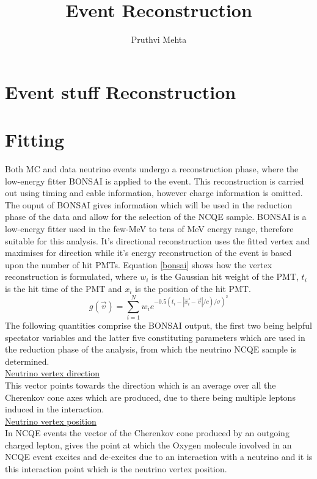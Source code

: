 \documentclass{article}
\title{Event Reconstruction}
\author{Pruthvi Mehta}
\begin{document}
\maketitle

\section{Event stuff Reconstruction}
\section{Fitting}
Both MC and data neutrino events undergo a reconstruction phase, where the low-energy fitter BONSAI is applied to the event. This reconstruction is carried out using timing and cable information, however charge information is omitted. The ouput of BONSAI gives information which will be used in the reduction phase of the data and allow for the selection of the NCQE sample. BONSAI is a low-energy fitter used in the few-MeV to tens of MeV energy range, therefore suitable for this analysis. It's directional reconstruction uses the fitted vertex and maximises for direction while it's energy reconstruction of the event is based upon the number of hit PMTs. Equation \ref{bonsai} shows how the vertex reconstruction is formulated, where $w_{i}$ is the Gaussian hit weight of the PMT, $t_{i}$ is the hit time of the PMT and $x_{i}$ is the position of the hit PMT.
\newline
\begin{equation}
\label{bonsai}
g(\vec{v})=\sum_{i=1}^{N} w_{i} e^{\left.-0.5\left(t_{i}-\left|\overrightarrow{x_{i}}-\vec{v}\right| / c\right) / \sigma\right)^{2}}
\end{equation}
The following quantities comprise the BONSAI output, the first two being helpful spectator variables and the latter five constituting parameters which are used in the reduction phase of the analysis, from which the neutrino NCQE sample is determined.\\

\underline{Neutrino vertex direction}\\

This vector points towards the direction which is an average over all the Cherenkov cone axes which are produced, due to there being multiple leptons induced in the interaction.\\



\underline{Neutrino vertex position}\\
In NCQE events the vector of the Cherenkov cone produced by an outgoing charged lepton, gives the point at which the Oxygen molecule involved in an NCQE event excites and de-excites due to an interaction with a neutrino and it is this interaction point which is the neutrino vertex position.
\newline
\end{document}
